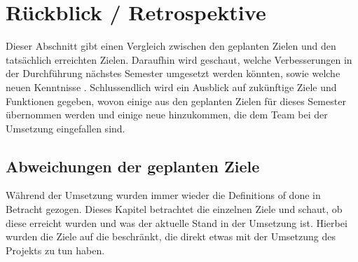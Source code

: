 \section{Rückblick / Retrospektive}\label{sec:rueckblick-retrospektive}

Dieser Abschnitt gibt einen Vergleich zwischen den geplanten Zielen und den tatsächlich erreichten Zielen.
Daraufhin wird geschaut, welche Verbesserungen in der Durchführung nächstes Semester umgesetzt werden könnten, sowie welche neuen Kenntnisse .
Schlussendlich wird ein Ausblick auf zukünftige Ziele und Funktionen gegeben, wovon einige aus den geplanten Zielen für dieses Semester übernommen werden und einige neue hinzukommen, die dem Team bei der Umsetzung eingefallen sind.

\subsection{Abweichungen der geplanten Ziele}\label{subsec:abweichungen-der-geplanten-ziele}
Während der Umsetzung wurden immer wieder die Definitions of done in Betracht gezogen.
Dieses Kapitel betrachtet die einzelnen Ziele und schaut, ob diese erreicht wurden und was der aktuelle Stand in der Umsetzung ist.
Hierbei wurden die Ziele auf die beschränkt, die direkt etwas mit der Umsetzung des Projekts zu tun haben.


